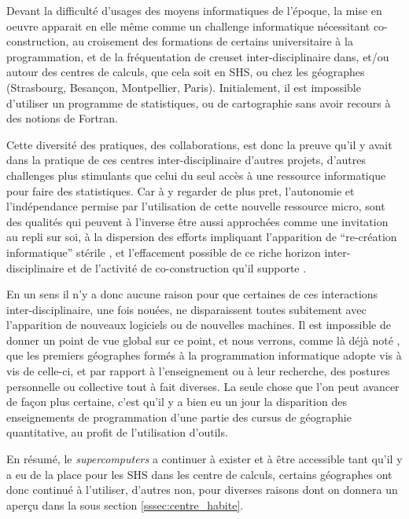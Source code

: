 Devant la difficulté d'usages des moyens informatiques de l'époque, la mise en oeuvre apparait en elle même comme un challenge informatique nécessitant  co-construction, au croisement des formations de certains universitaire à la programmation, et de la fréquentation de creuset inter-disciplinaire dans, et/ou autour des centres de calculs, que cela soit en SHS, ou chez les géographes (Strasbourg, Besançon, Montpellier, Paris). Initialement, il est impossible d'utiliser un programme de statistiques, ou de cartographie sans avoir recours à des notions de Fortran.

Cette diversité des pratiques, des collaborations, est donc la preuve qu'il y avait dans la pratique de ces centres inter-disciplinaire d'autres projets, d'autres challenges plus stimulants que celui du seul accès à une ressource informatique pour faire des statistiques. Car à y regarder de plus pret, l'autonomie et l'indépendance permise par l'utilisation de cette nouvelle ressource micro, sont des qualités qui peuvent à l'inverse être aussi approchées comme une invitation au repli sur soi, à la dispersion des efforts impliquant l'apparition de \enquote{re-création informatique} stérile , et l'effacement possible de ce riche horizon inter-disciplinaire et de l'activité de co-construction qu'il supporte \autocite{Banos2013}.

En un sens il n'y a donc aucune raison pour que certaines de ces interactions inter-disciplinaire, une fois nouées, ne disparaissent toutes subitement avec l'apparition de nouveaux logiciels ou de nouvelles machines. Il est impossible de donner un point de vue global sur ce point, et nous verrons, comme là déjà noté \autocite[372]{Cuyala2014}, que les premiers géographes formés à la programmation informatique adopte vis à vis de celle-ci, et par rapport à l'enseignement ou à leur recherche, des postures personnelle ou collective tout à fait diverses. La seule chose que l'on peut avancer de façon plus certaine, c'est qu'il y a bien eu un jour la disparition des enseignements de programmation d'une partie des cursus de géographie quantitative, au profit de l'utilisation d'outils.

En résumé, le \textit{supercomputers} a continuer à exister et à être accessible tant qu'il y a eu de la place pour les SHS dans les centre de calculs, certains géographes ont donc continué à l'utiliser, d'autres non, pour diverses raisons dont on donnera un aperçu dans la sous section \ref{sssec:centre_habite}.

